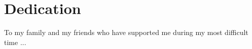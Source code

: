 \chapter*{Dedication}

To my family and my friends who have supported me during my most difficult time ...